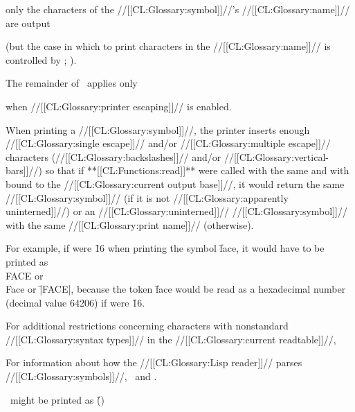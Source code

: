 only the characters of the //[[CL:Glossary:symbol]]//'s //[[CL:Glossary:name]]// are output 



(but the case in which to print characters in the //[[CL:Glossary:name]]// is
controlled by ;
\seesection\ReadtableCasePrintEffect).



The remainder of \thissection\ applies only 

when //[[CL:Glossary:printer escaping]]// is enabled.










When printing a //[[CL:Glossary:symbol]]//, the printer inserts enough 
//[[CL:Glossary:single escape]]// and/or //[[CL:Glossary:multiple escape]]//
characters (//[[CL:Glossary:backslashes]]// and/or //[[CL:Glossary:vertical-bars]]//) so that if
**[[CL:Functions:read]]** were called with the same  and
with  bound to the //[[CL:Glossary:current output base]]//, it
would return the same //[[CL:Glossary:symbol]]// (if it is not 
//[[CL:Glossary:apparently uninterned]]//) or an //[[CL:Glossary:uninterned]]// //[[CL:Glossary:symbol]]//
with the same //[[CL:Glossary:print name]]// (otherwise).

For example, if  were \f{16} 
when printing the symbol \f{face}, it would have to be printed as
\f{\\FACE} or \f{\\Face} or \f{|FACE|}, 
because the token \f{face} would be read as a hexadecimal
number (decimal value 64206) if  were \f{16}.

For additional restrictions concerning characters with  nonstandard
//[[CL:Glossary:syntax types]]// in the //[[CL:Glossary:current readtable]]//,  


For information about how the //[[CL:Glossary:Lisp reader]]// parses //[[CL:Glossary:symbols]]//,
\seesection\SymbolTokens\ and \secref\SharpsignColon.







\nil\ might be printed as \f{()} 

